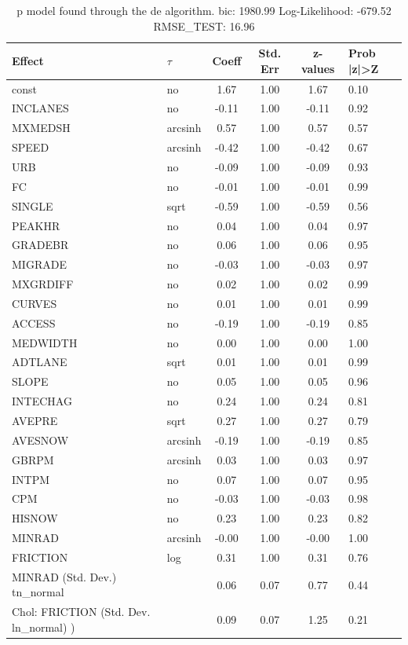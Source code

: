 \begin{table}
	\caption{p model found through the de algorithm. bic: 1980.99 Log-Likelihood: -679.52 RMSE_TEST: 16.96}
	\begin{center}
		\begin{tabular}{|l|l|c|c|c|l|}
			\hline
			Effect & $\tau$ & Coeff & Std. Err & z-values & Prob |z|>Z \\
			\hline
			const & no & 1.67 & 1.00 & 1.67 & 0.10 \\
			\hline
			INCLANES & no & -0.11 & 1.00 & -0.11 & 0.92 \\
			\hline
			MXMEDSH & arcsinh & 0.57 & 1.00 & 0.57 & 0.57 \\
			\hline
			SPEED & arcsinh & -0.42 & 1.00 & -0.42 & 0.67 \\
			\hline
			URB & no & -0.09 & 1.00 & -0.09 & 0.93 \\
			\hline
			FC & no & -0.01 & 1.00 & -0.01 & 0.99 \\
			\hline
			SINGLE & sqrt & -0.59 & 1.00 & -0.59 & 0.56 \\
			\hline
			PEAKHR & no & 0.04 & 1.00 & 0.04 & 0.97 \\
			\hline
			GRADEBR & no & 0.06 & 1.00 & 0.06 & 0.95 \\
			\hline
			MIGRADE & no & -0.03 & 1.00 & -0.03 & 0.97 \\
			\hline
			MXGRDIFF & no & 0.02 & 1.00 & 0.02 & 0.99 \\
			\hline
			CURVES & no & 0.01 & 1.00 & 0.01 & 0.99 \\
			\hline
			ACCESS & no & -0.19 & 1.00 & -0.19 & 0.85 \\
			\hline
			MEDWIDTH & no & 0.00 & 1.00 & 0.00 & 1.00 \\
			\hline
			ADTLANE & sqrt & 0.01 & 1.00 & 0.01 & 0.99 \\
			\hline
			SLOPE & no & 0.05 & 1.00 & 0.05 & 0.96 \\
			\hline
			INTECHAG & no & 0.24 & 1.00 & 0.24 & 0.81 \\
			\hline
			AVEPRE & sqrt & 0.27 & 1.00 & 0.27 & 0.79 \\
			\hline
			AVESNOW & arcsinh & -0.19 & 1.00 & -0.19 & 0.85 \\
			\hline
			GBRPM & arcsinh & 0.03 & 1.00 & 0.03 & 0.97 \\
			\hline
			INTPM & no & 0.07 & 1.00 & 0.07 & 0.95 \\
			\hline
			CPM & no & -0.03 & 1.00 & -0.03 & 0.98 \\
			\hline
			HISNOW & no & 0.23 & 1.00 & 0.23 & 0.82 \\
			\hline
			MINRAD & arcsinh & -0.00 & 1.00 & -0.00 & 1.00 \\
			\hline
			FRICTION & log & 0.31 & 1.00 & 0.31 & 0.76 \\
			\hline
			MINRAD (Std. Dev.) tn_normal &  & 0.06 & 0.07 & 0.77 & 0.44 \\
			\hline
			 Chol: FRICTION (Std. Dev. ln_normal) ) &  & 0.09 & 0.07 & 1.25 & 0.21 \\
			\hline
		\end{tabular}
	\end{center}
\end{table}
